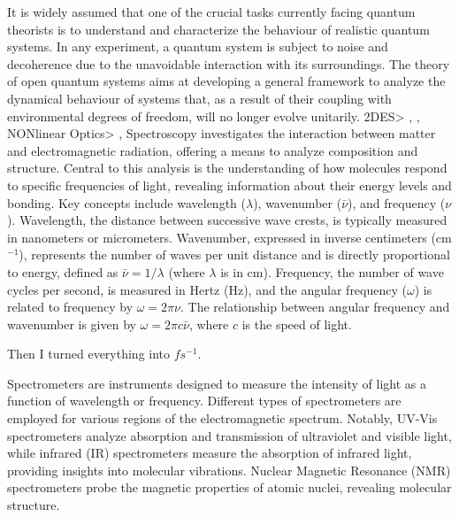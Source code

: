 It is widely assumed that one of the crucial tasks currently facing quantum theorists
is to understand and characterize the behaviour of realistic quantum systems. In
any experiment, a quantum system is subject to noise and decoherence due to the
unavoidable interaction with its surroundings. The theory of open quantum systems
aims at developing a general framework to analyze the dynamical behaviour of systems
that, as a result of their coupling with environmental degrees of freedom, will no
longer evolve unitarily. \cite{rivas_markovian_2010}
\newline
2DES> \cite{krumland_two-dimensional_2023}, \cite{segarra-marti_towards_2018}, \cite{sun_two-dimensional_2024}
\newline
NONlinear Optics> \cite{hamm_principles_nodate}, \cite{mukamel_principles_1995}
\newline
Spectroscopy investigates the interaction between matter and electromagnetic radiation, offering a means to analyze composition and structure.
Central to this analysis is the understanding of how molecules respond to specific frequencies of light, revealing information about their energy levels and bonding.
Key concepts include wavelength ($\lambda$), wavenumber ($\bar{\nu}$), and frequency ($\nu$).
Wavelength, the distance between successive wave crests, is typically measured in nanometers or micrometers.
Wavenumber, expressed in inverse centimeters (cm$^{-1}$), represents the number of waves per unit distance and is directly proportional to energy, defined as $\bar{\nu} = 1/\lambda$ (where $\lambda$ is in cm).
Frequency, the number of wave cycles per second, is measured in Hertz (Hz), and the angular frequency ($\omega$) is related to frequency by $\omega = 2\pi\nu$.
The relationship between angular frequency and wavenumber is given by $\omega = 2\pi c \bar{\nu}$, where $c$ is the speed of light.

\newline
Then I turned everything into $fs^{-1}$.


\newline
Spectrometers are instruments designed to measure the intensity of light as a function of wavelength or frequency.
Different types of spectrometers are employed for various regions of the electromagnetic spectrum.
Notably, UV-Vis spectrometers analyze absorption and transmission of ultraviolet and visible light, while infrared (IR) spectrometers measure the absorption of infrared light, providing insights into molecular vibrations.
Nuclear Magnetic Resonance (NMR) spectrometers probe the magnetic properties of atomic nuclei, revealing molecular structure.





